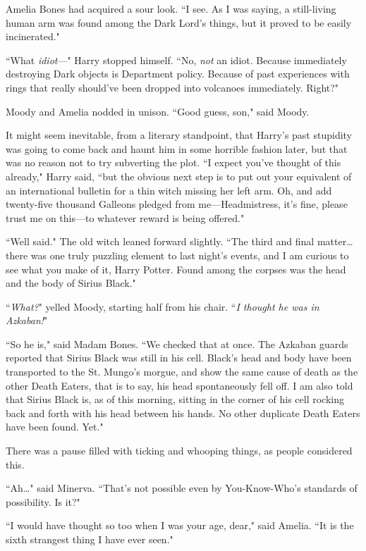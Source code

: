 Amelia Bones had acquired a sour look. ``I see. As I was saying, a still-living human arm was found among the Dark Lord's things, but it proved to be easily incinerated."

``What \emph{idiot}—" Harry stopped himself. ``No, \emph{not} an idiot. Because immediately destroying Dark objects is Department policy. Because of past experiences with rings that really should've been dropped into volcanoes immediately. Right?"

Moody and Amelia nodded in unison. ``Good guess, son," said Moody.

It might seem inevitable, from a literary standpoint, that Harry's past stupidity was going to come back and haunt him in some horrible fashion later, but that was no reason not to try subverting the plot. ``I expect you've thought of this already," Harry said, ``but the obvious next step is to put out your equivalent of an international bulletin for a thin witch missing her left arm. Oh, and add twenty-five thousand Galleons pledged from me—Headmistress, it's fine, please trust me on this—to whatever reward is being offered."

``Well said." The old witch leaned forward slightly. ``The third and final matter{\ldots} there was one truly puzzling element to last night's events, and I am curious to see what you make of it, Harry Potter. Found among the corpses was the head and the body of Sirius Black."

``\emph{What?}" yelled Moody, starting half from his chair. ``\emph{I thought he was in Azkaban!}"

``So he is," said Madam Bones. ``We checked that at once. The Azkaban guards reported that Sirius Black was still in his cell. Black's head and body have been transported to the St. Mungo's morgue, and show the same cause of death as the other Death Eaters, that is to say, his head spontaneously fell off. I am also told that Sirius Black is, as of this morning, sitting in the corner of his cell rocking back and forth with his head between his hands. No other duplicate Death Eaters have been found. Yet."

There was a pause filled with ticking and whooping things, as people considered this.

``Ah{\ldots}" said Minerva. ``That's not possible even by You-Know-Who's standards of possibility. Is it?"

``I would have thought so too when I was your age, dear," said Amelia. ``It is the sixth strangest thing I have ever seen."

